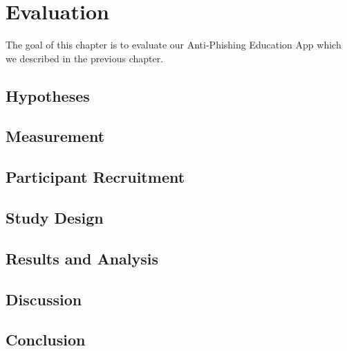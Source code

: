 \section{Evaluation}
\label{s:evaluation}
The goal of this chapter is to evaluate our Anti-Phishing Education App which we described in the previous chapter. 

\subsection{Hypotheses}

\subsection{Measurement}

\subsection{Participant Recruitment}

\subsection{Study Design}

\subsection{Results and Analysis}
\subsection{Discussion}
\subsection{Conclusion}
